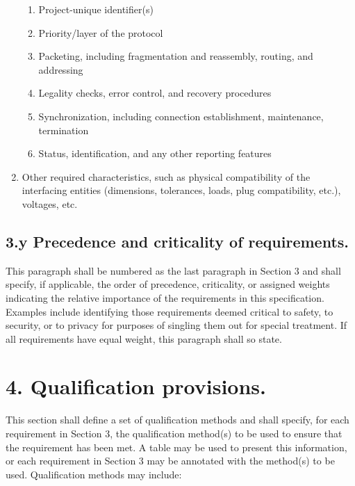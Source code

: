 \begin{enumerate}
  \begin{enumerate}
  \itemsep1pt\parskip0pt
  \item
    Project-unique identifier(s)
  \item
    Priority/layer of the protocol
  \item
    Packeting, including fragmentation and reassembly, routing, and
    addressing
  \item
    Legality checks, error control, and recovery procedures
  \item
    Synchronization, including connection establishment, maintenance,
    termination
  \item
    Status, identification, and any other reporting features
  \end{enumerate}
\item
  Other required characteristics, such as physical compatibility of the
  interfacing entities (dimensions, tolerances, loads, plug
  compatibility, etc.), voltages, etc.
\end{enumerate}

\subsection{3.y Precedence and criticality of requirements.}

This paragraph shall be numbered as the last paragraph in Section 3 and
shall specify, if applicable, the order of precedence, criticality, or
assigned weights indicating the relative importance of the requirements
in this specification. Examples include identifying those requirements
deemed critical to safety, to security, or to privacy for purposes of
singling them out for special treatment. If all requirements have equal
weight, this paragraph shall so state.

\section{4. Qualification provisions.}

This section shall define a set of qualification methods and shall
specify, for each requirement in Section 3, the qualification method(s)
to be used to ensure that the requirement has been met. A table may be
used to present this information, or each requirement in Section 3 may
be annotated with the method(s) to be used. Qualification methods may
include:

